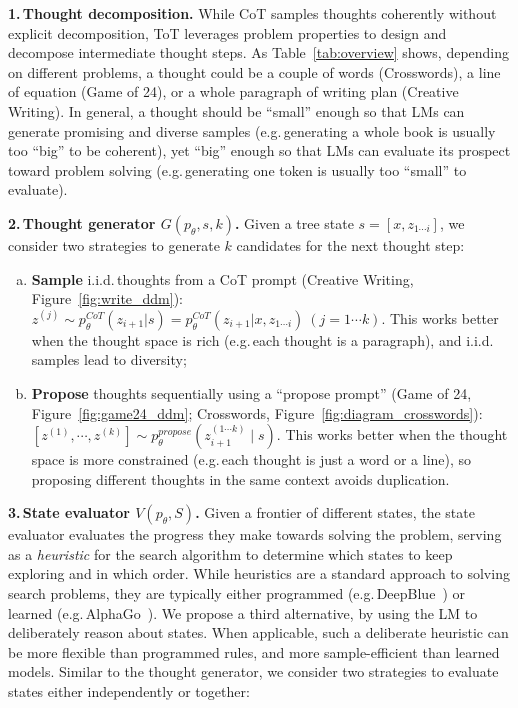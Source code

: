 \textbf{1.\,Thought decomposition.} While CoT samples thoughts coherently without explicit decomposition, ToT leverages problem properties to design and decompose intermediate thought steps. As Table~\ref{tab:overview} shows, depending on different problems, a thought could be a couple of words (Crosswords), a line of equation (Game of 24), or a whole paragraph of writing plan (Creative Writing). In general, a thought should be ``small'' enough so that LMs can generate promising and diverse samples (e.g.\,generating a whole book is usually too ``big'' to be coherent), yet ``big'' enough so that LMs can evaluate its prospect toward problem solving (e.g.\,generating one token is usually too ``small'' to evaluate). 

\textbf{2.\,Thought generator $G(p_\theta, s, k)$.} Given a tree state $s = [x, z_{1\cdots i}]$, we consider two strategies to generate $k$ candidates for the next thought step:

\begin{enumerate}[(a)]

\item 
\textbf{Sample} i.i.d.\,thoughts from a CoT prompt (Creative Writing, Figure~\ref{fig:write_ddm}): $z^{(j)} \sim p_\theta^{CoT}(z_{i+1} | s) = p_\theta^{CoT}(z_{i+1} | x, z_{1\cdots i}) \ (j=1 \cdots k)$. This works better when the thought space is rich (e.g.\,each thought is a paragraph), and i.i.d.\,samples lead to diversity; 

\item
\textbf{Propose} thoughts sequentially using a ``propose prompt'' (Game of 24, Figure~\ref{fig:game24_ddm}; Crosswords, Figure~\ref{fig:diagram_crosswords}): $[z^{(1)}, \cdots, z^{(k)}] \sim p_\theta^{propose}(z_{i+1}^{(1 \cdots k)} \mid s)$. This works better when the thought space is more constrained (e.g.\,each thought is just a word or a line), so proposing different thoughts in the same context avoids duplication. 

\end{enumerate}

\textbf{3.\,State evaluator $V(p_\theta, S)$.} Given a frontier of different states, the state evaluator evaluates the progress they make towards  solving the problem, serving as a {\em heuristic} for the search algorithm to determine which states to keep exploring and in which order. While heuristics are a standard approach to solving search problems, they are typically either programmed (e.g.\,DeepBlue~\citep{campbell2002deep}) or learned (e.g.\,AlphaGo~\cite{silver2017mastering}). 
We propose a third alternative, by using the LM to deliberately reason about states. When applicable, such a deliberate heuristic can be more flexible than programmed rules, and more sample-efficient than learned models. Similar to the thought generator, we consider two strategies to evaluate states either independently or together:

